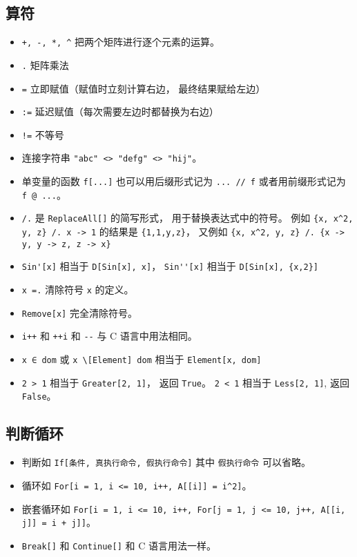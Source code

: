 \subsection{算符}
\begin{itemize}
\item \verb`+, -, *, ^` 把两个矩阵进行逐个元素的运算。
\item \verb`.` 矩阵乘法
\item \verb`=` 立即赋值（赋值时立刻计算右边， 最终结果赋给左边）
\item \verb`:=` 延迟赋值（每次需要左边时都替换为右边）
\item \verb`!=` 不等号
\item 连接字符串 \verb`"abc" <> "defg" <> "hij"`。
\item 单变量的函数 \verb`f[...]` 也可以用后缀形式记为 \verb`... // f` 或者用前缀形式记为 \verb`f @ ...`。
\item \verb`/.` 是 \verb`ReplaceAll[]` 的简写形式， 用于替换表达式中的符号。 例如 \verb`{x, x^2, y, z} /. x -> 1` 的结果是 \verb`{1,1,y,z}`， 又例如 \verb`{x, x^2, y, z} /. {x -> y, y -> z, z -> x}`
\item \verb`Sin'[x]` 相当于 \verb`D[Sin[x], x]`， \verb`Sin''[x]` 相当于 \verb`D[Sin[x], {x,2}]`
\item \verb`x =.` 清除符号 \verb`x` 的定义。
\item \verb`Remove[x]` 完全清除符号。
\item \verb`i++` 和 \verb`++i` 和 \verb`--` 与 C 语言中用法相同。
\item \verb`x ∈ dom` 或 \verb`x \[Element] dom` 相当于 \verb`Element[x, dom]`
\item \verb`2 > 1` 相当于 \verb`Greater[2, 1]`， 返回 \verb`True`。 \verb`2 < 1` 相当于 \verb`Less[2, 1]`, 返回 \verb`False`。
\end{itemize}

\subsection{判断循环}
\begin{itemize}
\item 判断如 \verb`If[条件, 真执行命令, 假执行命令]` 其中 \verb`假执行命令` 可以省略。
\item 循环如 \verb`For[i = 1, i <= 10, i++, A[[i]] = i^2]`。
\item 嵌套循环如 \verb`For[i = 1, i <= 10, i++, For[j = 1, j <= 10, j++, A[[i, j]] = i + j]]`。
\item \verb`Break[]` 和 \verb`Continue[]` 和 C 语言用法一样。
\end{itemize}

